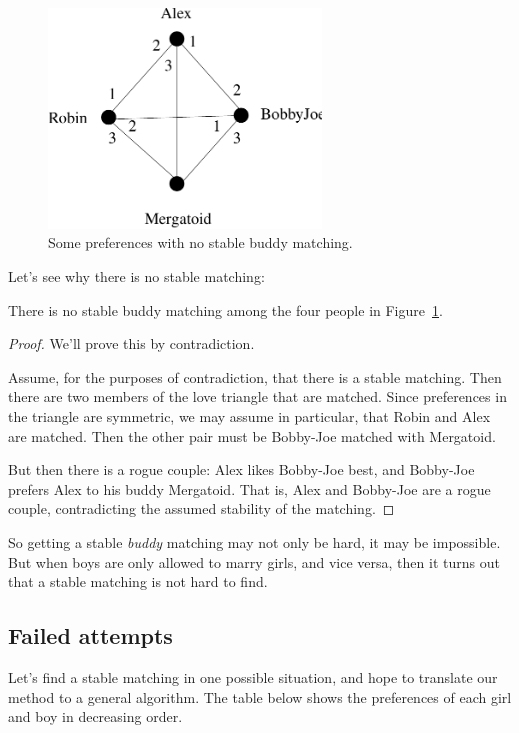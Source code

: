 \begin{figure}[htbp]
\centering \includegraphics[height=2.3in]{figures/loveTriangle.pdf}
\caption{Some preferences with no stable buddy matching.}
\label{fig:buddy}
\end{figure}
 
Let's see why there is no stable matching: 
\begin{lemma*}
There is no stable buddy matching among the four people in
Figure~\ref{fig:buddy}.
\end{lemma*}
 
\begin{proof}
We'll prove this by contradiction.

Assume, for the purposes of contradiction, that there is a stable
matching.  Then there are two members of the love triangle that are
matched.  Since preferences in the triangle are symmetric, we may assume
in particular, that Robin and Alex are matched.  Then the other pair must
be Bobby-Joe matched with Mergatoid.

But then there is a rogue couple: Alex likes Bobby-Joe best, and Bobby-Joe
prefers Alex to his buddy Mergatoid.  That is, Alex and Bobby-Joe are a
rogue couple, contradicting the assumed stability of the matching.
\end{proof}

So getting a stable \emph{buddy} matching may not only be hard, it may be
impossible.  But when boys are only allowed to marry girls, and vice
versa, then it turns out that a stable matching is not hard to find.


\iffalse

\subsection{Failed attempts}

Let's find a stable matching in one possible situation, and hope to
translate our method to a general algorithm.  The table below shows the
preferences of each girl and boy in decreasing order.

